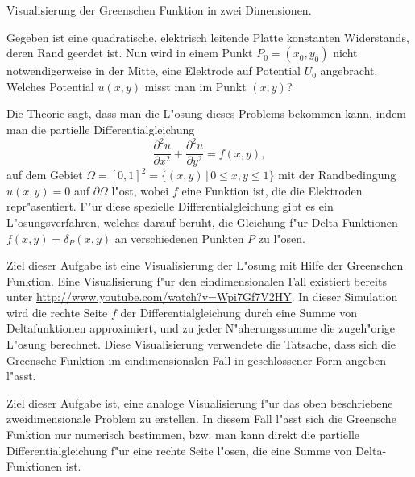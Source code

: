 \begin{aufgabe}
Visualisierung der Greenschen Funktion in zwei Dimensionen.
\end{aufgabe}

Gegeben ist eine quadratische, elektrisch leitende Platte
konstanten Widerstands, deren Rand geerdet ist.
Nun wird in einem Punkt $P_0=(x_0,y_0)$ nicht notwendigerweise
in der Mitte, eine Elektrode auf Potential $U_0$ angebracht.
Welches Potential $u(x,y)$ misst man im Punkt $(x,y)$?

Die Theorie sagt, dass man die L"osung dieses Problems bekommen
kann, indem man die partielle Differentialgleichung
\[
\frac{\partial^2u}{\partial x^2}
+
\frac{\partial^2u}{\partial y^2}
=f(x,y),
\]
auf dem Gebiet $\Omega=[0,1]^2=\{(x,y)\,|\, 0\le x,y\le 1\}$ 
mit der Randbedingung
$u(x,y)=0$ auf $\partial \Omega$
l"ost, wobei $f$ eine Funktion ist, die die Elektroden repr"asentiert.
F"ur diese spezielle Differentialgleichung gibt es ein L"osungsverfahren,
welches darauf beruht, die Gleichung f"ur Delta-Funktionen
$f(x,y)=\delta_P(x,y)$ an verschiedenen Punkten $P$ zu l"osen.

Ziel dieser Aufgabe ist eine Visualisierung der L"osung mit Hilfe der
Greenschen Funktion. Eine Visualisierung f"ur den eindimensionalen
Fall existiert bereits unter \url{http://www.youtube.com/watch?v=Wpi7Gf7V2HY}.
In dieser Simulation wird die rechte Seite $f$ der Differentialgleichung
durch eine Summe von Deltafunktionen approximiert, und zu jeder
N"aherungssumme die zugeh"orige L"osung berechnet. Diese Visualisierung
verwendete die Tatsache, dass sich die Greensche Funktion im eindimensionalen
Fall in geschlossener Form angeben l"asst.

Ziel dieser Aufgabe ist, eine analoge Visualisierung f"ur das 
oben beschriebene zweidimensionale Problem zu erstellen.
In diesem Fall l"asst sich die Greensche Funktion nur numerisch
bestimmen, bzw. man kann direkt die partielle Differentialgleichung
f"ur eine rechte Seite l"osen, die eine Summe von Delta-Funktionen ist.




